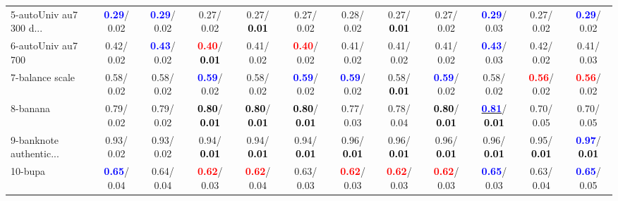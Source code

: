 \begin{table}[h]
\begin{center}
{\begin{tabular}{lc|c|c|c|c|c|c|c|c|c|c}
5-autoUniv au7 300 d... & \textcolor{blue}{\textbf{  0.29}}/  0.02 & \textcolor{blue}{\textbf{  0.29}}/  0.02 &   0.27/  0.02 &   0.27/\textcolor{black}{\textbf{  0.01}} &   0.27/  0.02 &   0.28/  0.02 &   0.27/\textcolor{black}{\textbf{  0.01}} &   0.27/  0.02 & \textcolor{blue}{\textbf{  0.29}}/  0.03 &   0.27/  0.02 & \textcolor{blue}{\textbf{  0.29}}/  0.02 \\
6-autoUniv au7 700 &   0.42/  0.02 & \textcolor{blue}{\textbf{  0.43}}/  0.02 & \textcolor{red}{\textbf{  0.40}}/\textcolor{black}{\textbf{  0.01}} &   0.41/  0.02 & \textcolor{red}{\textbf{  0.40}}/  0.02 &   0.41/  0.02 &   0.41/  0.02 &   0.41/  0.02 & \textcolor{blue}{\textbf{  0.43}}/  0.03 &   0.42/  0.02 &   0.41/  0.03 \\
7-balance scale &   0.58/  0.02 &   0.58/  0.02 & \textcolor{blue}{\textbf{  0.59}}/  0.02 &   0.58/  0.02 & \textcolor{blue}{\textbf{  0.59}}/  0.02 & \textcolor{blue}{\textbf{  0.59}}/  0.02 &   0.58/\textcolor{black}{\textbf{  0.01}} & \textcolor{blue}{\textbf{  0.59}}/  0.02 &   0.58/  0.02 & \textcolor{red}{\textbf{  0.56}}/  0.02 & \textcolor{red}{\textbf{  0.56}}/  0.02 \\ \hline
8-banana &   0.79/  0.02 &   0.79/  0.02 & \textcolor{black}{\textbf{  0.80}}/\textcolor{black}{\textbf{  0.01}} & \textcolor{black}{\textbf{  0.80}}/\textcolor{black}{\textbf{  0.01}} & \textcolor{black}{\textbf{  0.80}}/\textcolor{black}{\textbf{  0.01}} &   0.77/  0.03 &   0.78/  0.04 & \textcolor{black}{\textbf{  0.80}}/\textcolor{black}{\textbf{  0.01}} & \underline{\textcolor{blue}{\textbf{  0.81}}}/\textcolor{black}{\textbf{  0.01}} &   0.70/  0.05 &   0.70/  0.05 \\
9-banknote authentic... &   0.93/  0.02 &   0.93/  0.02 &   0.94/\textcolor{black}{\textbf{  0.01}} &   0.94/\textcolor{black}{\textbf{  0.01}} &   0.94/\textcolor{black}{\textbf{  0.01}} &   0.96/\textcolor{black}{\textbf{  0.01}} &   0.96/\textcolor{black}{\textbf{  0.01}} &   0.96/\textcolor{black}{\textbf{  0.01}} &   0.96/\textcolor{black}{\textbf{  0.01}} &   0.95/\textcolor{black}{\textbf{  0.01}} & \textcolor{blue}{\textbf{  0.97}}/\textcolor{black}{\textbf{  0.01}} \\
10-bupa & \textcolor{blue}{\textbf{  0.65}}/  0.04 &   0.64/  0.04 & \textcolor{red}{\textbf{  0.62}}/  0.03 & \textcolor{red}{\textbf{  0.62}}/  0.04 &   0.63/  0.03 & \textcolor{red}{\textbf{  0.62}}/  0.03 & \textcolor{red}{\textbf{  0.62}}/  0.03 & \textcolor{red}{\textbf{  0.62}}/  0.03 & \textcolor{blue}{\textbf{  0.65}}/  0.03 &   0.63/  0.04 & \textcolor{blue}{\textbf{  0.65}}/  0.05 \\

\end{tabular}}
\end{center}
\end{table}
